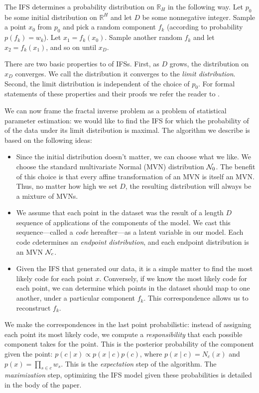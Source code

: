 \documentclass[10pt,a4paper,oneside]{article}
\theoremstyle{definition}
\newcommand{\R}{\mathbb{R}}
\newcommand{\cN}{{\cal N}}
\theoremstyle{definition}
\begin{document}
The IFS determines a probability distribution on $\R_H$ in the following way. Let $p_0$ be some initial distribution on $\R^H$ and let $D$ be some nonnegative integer. Sample a point $x_0$ from $p_0$ and pick a random component $f_k$ (according to probability $p(f_k) = w_k$). Let $x_1 = f_k(x_0)$. Sample another random $f_k$ and let $x_2 = f_k(x_1)$, and so on until $x_D$.

There are two basic properties to of IFSs. First, as $D$ grows, the distribution on $x_D$ converges. We call the distribution it converges to the \emph{limit distribution}. Second, the limit distribution is independent of the choice of $p_0$. For formal statements of these properties and their proofs we refer the reader to \cite{hutchinson2000deterministic}.

We can now frame the fractal inverse problem as a problem of statistical parameter estimation: we would like to find the IFS for which the probability of of the data under its limit distribution is maximal. The algorithm we describe is based on the following ideas:
\begin{itemize}
  \item Since the initial distribution doesn't matter, we can choose what we like. We choose the standard multivariate Normal (MVN) distribution $\cN_0$. The benefit of this choice is that every affine transformation of an MVN is itself an MVN. Thus, no matter how high we set $D$, the resulting distribution will always be a mixture of MVNs. 
  \item We assume that each point in the dataset was the result of a length $D$ sequence of applications of the components of the model. We cast this sequence---called a \emph{code} hereafter---as a latent variable in our model. Each code $c$determines an \emph{endpoint distribution}, and each endpoint distribution is an MVN $\cN_c$.
  \item  Given the IFS that generated our data, it is a simple matter to find the most likely code for each point $x$. Conversely, if we know the most likely code for each point, we can determine which points in the dataset should map to one another, under a particular component $f_k$. This correspondence allows us to reconstruct $f_k$.    
\end{itemize}

We make the correspondences in the last point probabilistic: instead of assigning each point its most likely code, we compute a \emph{responsibility} that each possible component takes for the point. This is the posterior probability of the component given the point: $p(c \mid x) \propto p(x \mid c) p(c)$, where $p(x\mid c) = N_c(x)$ and $p(x) = \prod_{s \in c} w_s$. This is the \emph{expectation} step of the algorithm. The \emph{maximization} step, optimizing the IFS model given these probabilities is detailed in the body of the paper. 
\end{document}
